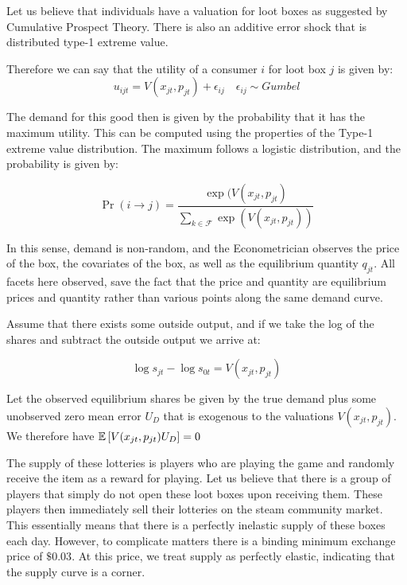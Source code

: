 \documentclass[12pt]{paper}
\begin{document}
Let us believe that individuals have a valuation for loot boxes as
suggested by Cumulative Prospect Theory. There is also an additive
error shock that is distributed type-1 extreme value.

Therefore we can say that the utility of a consumer $i$ for loot box
$j$ is given by:
\begin{equation*}
  u_{ijt} = V( x_{jt}, p_{jt} ) + \epsilon_{ij} \quad \epsilon_{ij} \sim Gumbel
\end{equation*}

The demand for this good then is given by the probability that it has
the maximum utility. This can be computed using the properties of the
Type-1 extreme value distribution. The maximum follows a logistic
distribution, and the probability is given by:

\begin{equation*}
  \Pr( i \rightarrow j ) = \frac{\exp( V(x_{jt},p_{jt})}{ \sum_{k \in \mathcal{F}}
    \exp(V(x_{jt},p_{jt}))}
\end{equation*}

In this sense, demand is non-random, and the Econometrician observes
the price of the box, the covariates of the box, as well as the
equilibrium quantity $q_{jt}$. All facets here observed, save the fact
that the price and quantity are equilibrium prices and quantity rather
than various points along the same demand curve.

Assume that there exists some outside output, and if we take the log
of the shares and subtract the outside output we arrive at:

\begin{equation*}
  \log s_{jt} - \log s_{0t} = V(x_{jt}, p_{jt})
\end{equation*}

Let the observed equilibrium shares be given by the true demand plus
some unobserved zero mean error $U_D$ that is exogenous to the valuations
$V(x_{jt}, p_{jt})$. We therefore have $\mathbb{E} \left [ V(x_{jt},p_{jt})U_D \right ] = 0$

The supply of these lotteries is players who are playing the game and
randomly receive the item as a reward for playing. Let us believe that
there is a group of players that simply do not open these loot boxes
upon receiving them. These players then immediately sell their
lotteries on the steam community market. This essentially means that
there is a perfectly inelastic supply of these boxes each
day. However, to complicate matters there is a binding minimum
exchange price of $\$0.03$. At this price, we treat supply as
perfectly elastic, indicating that the supply curve is a corner.
\end{document}
